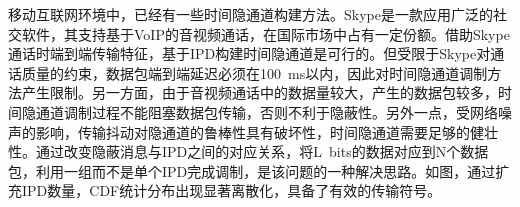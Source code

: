
移动互联网环境中，已经有一些时间隐通道构建方法。Skype是一款应用广泛的社交软件，其支持基于VoIP的音视频通话，在国际市场中占有一定份额。借助Skype通话时端到端传输特征，基于IPD构建时间隐通道是可行的。但受限于Skype对通话质量的约束，数据包端到端延迟必须在{100\ ms}以内，因此对时间隐通道调制方法产生限制。另一方面，由于音视频通话中的数据量较大，产生的数据包较多，时间隐通道调制过程不能阻塞数据包传输，否则不利于隐蔽性。另外一点，受网络噪声的影响，传输抖动对隐通道的鲁棒性具有破坏性，时间隐通道需要足够的健壮性。通过改变隐蔽消息与IPD之间的对应关系，将{L\ bits}的数据对应到N个数据包，利用一组而不是单个IPD完成调制，是该问题的一种解决思路。如图，通过扩充IPD数量，CDF统计分布出现显著离散化，具备了有效的传输符号。


